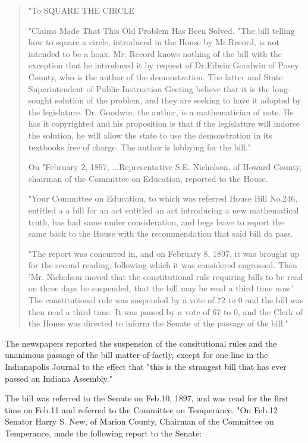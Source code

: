 \begin{quote}
                        "To SQUARE THE CIRCLE

   "Claims Made That This Old Problem Has Been Solved.
   "The bill telling how to square a circle, introduced in the House by
Mr.Record, is not intended to be a hoax. Mr. Record knows nothing of the bill
with the exception that he introduced it by request of Dr.Edwin Goodwin of
Posey County, who is the author of the demonstration. The latter and State
Superintendent of Public Instruction Geeting believe that it is the long-sought
solution of the problem, and they are seeking to have it adopted by the
legislature. Dr. Goodwin, the author, is a mathematician of note. He has it
copyrighted and his proposition is that if the legislature will indorse the
solution, he will allow the state to use the demonstration in its textbooks
free of charge. The author is lobbying for the bill."

On "February 2, 1897, ...Representative S.E. Nicholson, of Howard County,
chairman of the Committee on Education, reported to the House.


   "Your Committee on Education, to which was referred House Bill No.246,
entitled a a bill for an act entitled an act introducing a new mathematical
truth, has had same under consideration, and begs leave to report the same
back to the House with the recommendation that said bill do pass.

"The report was concurred in, and on February 8, 1897, it was brought up for 
the
second reading, following which it was considered engrossed. Then
'Mr. Nicholson moved that the constitutional rule requiring bills to be read
on three days be suspended, that the bill may be read a third time now.' The
constitutional rule was suspended by a vote of 72 to 0 and the bill was then
read a third time. It was passed by a vote of 67  to 0, and the Clerk of the
House was directed to inform the Senate of the passage of the bill."

\end{quote}

The newspapers reported the suspension of the consitutional rules and
the unanimous passage of the bill matter-of-factly, except for one line
in the Indianapolis Journal to the effect that "this is the strangest
bill that has ever passed an Indiana Assembly."



The bill was referred to the Senate on Feb.10, 1897, and was read for the first
time on Feb.11 and referred to the Committee on Temperance. "On Feb.12
Senator Harry S. New, of Marion County, Chairman of the Committee on
Temperance, made the following report to the Senate:


